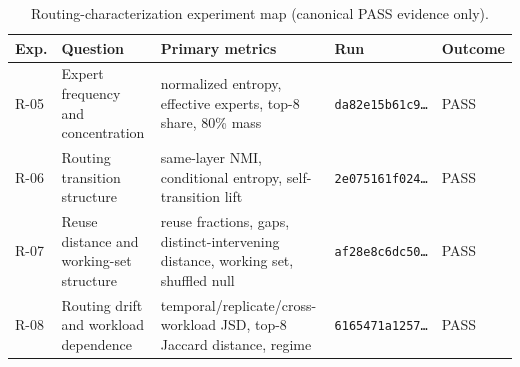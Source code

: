 \begin{table}[t]
\centering
\caption{Routing-characterization experiment map (canonical PASS evidence only).}
\label{tab:iib-map}
\small
\begin{tabularx}{\linewidth}{@{}l >{\raggedright\arraybackslash}p{2.9cm}
  >{\raggedright\arraybackslash}X l l@{}}
\toprule
Exp. & Question & Primary metrics & Run & Outcome \\
\midrule
R-05 & Expert frequency and concentration & normalized entropy, effective experts, top-8 share, 80\% mass & \texttt{da82e15b61c9\ldots} & PASS \\
R-06 & Routing transition structure & same-layer NMI, conditional entropy, self-transition lift & \texttt{2e075161f024\ldots} & PASS \\
R-07 & Reuse distance and working-set structure & reuse fractions, gaps, distinct-intervening distance, working set, shuffled null & \texttt{af28e8c6dc50\ldots} & PASS \\
R-08 & Routing drift and workload dependence & temporal/replicate/cross-workload JSD, top-8 Jaccard distance, regime & \texttt{6165471a1257\ldots} & PASS \\
\bottomrule
\end{tabularx}
\end{table}
